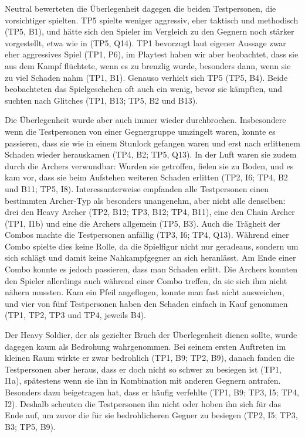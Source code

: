 \documentclass[../Main.tex]{subfiles}
\begin{document}
Neutral bewerteten die Überlegenheit dagegen die beiden Testpersonen, die vorsichtiger spielten. TP5 spielte weniger aggressiv, eher taktisch und methodisch (TP5, B1), und hätte sich den Spieler im Vergleich zu den Gegnern noch stärker vorgestellt, etwa wie in  (TP5, Q14). TP1 bevorzugt laut eigener Aussage zwar eher aggressives Spiel (TP1, P6), im Playtest haben wir aber beobachtet, dass sie aus dem Kampf flüchtete, wenn es zu brenzlig wurde, besonders dann, wenn sie zu viel Schaden nahm (TP1, B1). Genauso verhielt sich TP5 (TP5, B4). Beide beobachteten das Spielgeschehen oft auch ein wenig, bevor sie kämpften, und suchten nach Glitches (TP1, B13; TP5, B2 und B13).

Die Überlegenheit wurde aber auch immer wieder durchbrochen. Insbesondere wenn die Testpersonen von einer Gegnergruppe umzingelt waren, konnte es passieren, dass sie wie in einem Stunlock gefangen waren und erst nach erlittenem Schaden wieder herauskamen (TP4, B2; TP5, Q13). In der Luft waren sie zudem durch die Archers verwundbar: Wurden sie getroffen, fielen sie zu Boden, und es kam vor, dass sie beim Aufstehen weiteren Schaden erlitten (TP2, I6; TP4, B2 und B11; TP5, I8). Interessanterweise empfanden alle Testpersonen einen bestimmten Archer-Typ als besonders unangenehm, aber nicht alle denselben: drei den Heavy Archer (TP2, B12; TP3, B12; TP4, B11), eine den Chain Archer (TP1, I1b) und eine die Archers allgemein (TP5, B3). Auch die Trägheit der Combos machte die Testpersonen anfällig (TP3, I6; TP4, Q13). Während einer Combo spielte dies keine Rolle, da die Spielfigur nicht nur geradeaus, sondern um sich schlägt und damit keine Nahkampfgegner an sich heranlässt. Am Ende einer Combo konnte es jedoch passieren, dass man Schaden erlitt. Die Archers konnten den Spieler allerdings auch während einer Combo treffen, da sie sich ihm nicht nähern mussten. Kam ein Pfeil angeflogen, konnte man fast nicht ausweichen, und vier von fünf Testpersonen haben den Schaden einfach in Kauf genommen (TP1, TP2, TP3 und TP4, jeweils B4).

Der Heavy Soldier, der als gezielter Bruch der Überlegenheit dienen sollte, wurde dagegen kaum als Bedrohung wahrgenommen. Bei seinem ersten Auftreten im kleinen Raum wirkte er zwar bedrohlich (TP1, B9; TP2, B9), danach fanden die Testpersonen aber heraus, dass er doch nicht so schwer zu besiegen ist (TP1, I1a), spätestens wenn sie ihn in Kombination mit anderen Gegnern antrafen. Besonders dazu beigetragen hat, dass er häufig verfehlte (TP1, B9; TP3, I5; TP4, I2). Deshalb scheuten die Testpersonen ihn nicht oder hoben ihn sich für das Ende auf, um zuvor die für sie bedrohlicheren Gegner zu besiegen (TP2, I5; TP3, B3; TP5, B9).
\end{document}
